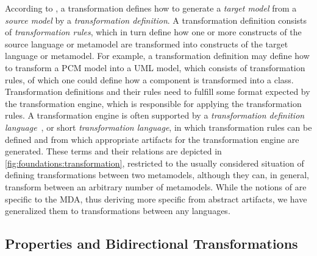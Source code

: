 According to \textcite{kleppe2003mdaExplained-Book}, a transformation defines how to generate a \emph{target model} from a \emph{source model} by a \emph{transformation definition}.
A transformation definition consists of \emph{transformation rules}, which in turn define how one or more constructs of the source language or metamodel are transformed into constructs of the target language or metamodel.
For example, a transformation definition may define how to transform a \gls{PCM} model into a \gls{UML} model, which consists of transformation rules, of which one could define how a component is transformed into a class.
Transformation definitions and their rules need to fulfill some format expected by the transformation engine, which is responsible for applying the transformation rules.
A transformation engine is often supported by a \emph{transformation definition language}~\cite[Sec. 9.2]{kleppe2003mdaExplained-Book}, or short \emph{transformation language}, in which transformation rules can be defined and from which appropriate artifacts for the transformation engine are generated.
These terms and their relations are depicted in \autoref{fig:foundations:transformation}, restricted to the usually considered situation of defining transformations between two metamodels, although they can, in general, transform between an arbitrary number of metamodels.
While the notions of \textcite{kleppe2003mdaExplained-Book} are specific to the \gls{MDA}, thus deriving more specific from abstract artifacts, we have generalized them to transformations between any languages.


\subsection{Properties and Bidirectional Transformations}
\label{chap:foundations:transformations:properties}

